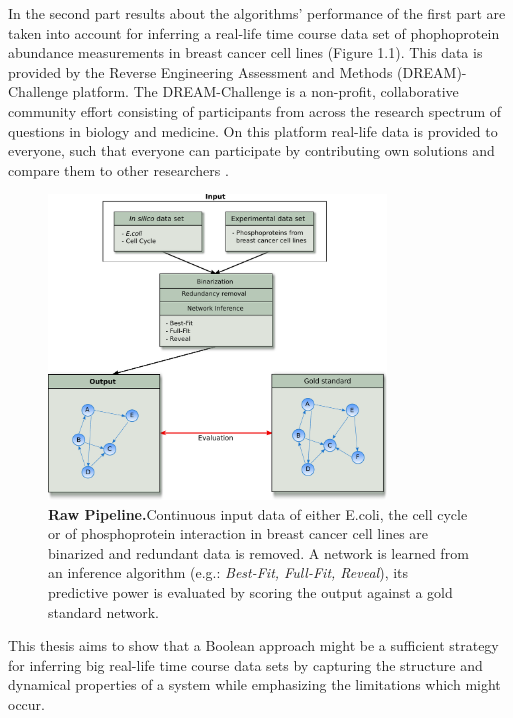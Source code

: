 In the second part results about the algorithms' performance of the first part are taken into account for inferring a real-life time course data set of phophoprotein abundance measurements in breast cancer cell lines (Figure 1.1). This data is provided by the Reverse Engineering Assessment and Methods (DREAM)-Challenge platform. The DREAM-Challenge is a non-profit, collaborative community effort consisting of participants from across the research spectrum of questions in biology and medicine. On this platform real-life data is provided to everyone, such that everyone can participate by contributing own solutions and compare them to other researchers \citep{aboutdream, Bender.2016}.
    
\begin{figure}[H]
\captionsetup{width=0.9\linewidth}
\centering
\includegraphics[width=0.8\textwidth]{./Bilder/motivation_pipeline.pdf}
\caption[Raw pipeline]{\textbf{Raw Pipeline.}Continuous input data of either E.coli, the cell cycle or of phosphoprotein interaction in breast cancer cell lines are binarized and redundant data is removed. A network is learned from an inference algorithm (e.g.: \textit{Best-Fit, Full-Fit, Reveal}), its predictive power is evaluated by scoring the output against a gold standard network. }
\label{fig:General Pipeline}
\end{figure} 

This thesis aims to show that a Boolean approach might be a sufficient strategy for inferring big real-life time course data sets by capturing the structure and dynamical properties of a system while emphasizing the limitations which might occur.


